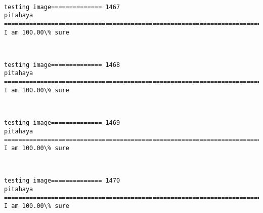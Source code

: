\documentclass[11pt]{article}
\begin{document}
    \begin{center}
    \end{center}
    { \hspace*{\fill} \\}
    
    \begin{Verbatim}[commandchars=\\\{\}]
testing image============== 1467
pitahaya
============================================================================
I am 100.00\% sure

    \end{Verbatim}

    \begin{center}
    \end{center}
    { \hspace*{\fill} \\}
    
    \begin{Verbatim}[commandchars=\\\{\}]
testing image============== 1468
pitahaya
============================================================================
I am 100.00\% sure

    \end{Verbatim}

    \begin{center}
    \end{center}
    { \hspace*{\fill} \\}
    
    \begin{Verbatim}[commandchars=\\\{\}]
testing image============== 1469
pitahaya
============================================================================
I am 100.00\% sure

    \end{Verbatim}

    \begin{center}
    \end{center}
    { \hspace*{\fill} \\}
    
    \begin{Verbatim}[commandchars=\\\{\}]
testing image============== 1470
pitahaya
============================================================================
I am 100.00\% sure

    \end{Verbatim}
\end{document}
